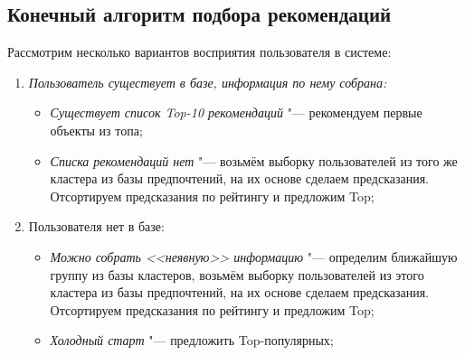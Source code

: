 \documentclass[a4paper,14pt]{article}
\begin{document}
\subsection{Конечный алгоритм подбора рекомендаций}
Рассмотрим несколько вариантов восприятия пользователя в системе:
\begin{enumerate}
\item {\it Пользователь существует в базе, информация по нему собрана:}
\begin{itemize}
\item {\it Существует список Top-10 рекомендаций} "--- рекомендуем первые объекты из топа;
\item {\it Списка рекомендаций нет} "--- возьмём выборку пользователей из того же кластера из базы предпочтений, на их основе сделаем предсказания. Отсортируем предсказания по рейтингу и предложим Top;
\end{itemize} 
\item Пользователя нет в базе:
\begin{itemize}
\item {\it Можно собрать <<неявную>> информацию} "--- определим ближайшую группу из базы кластеров, возьмём выборку пользователей из этого кластера из базы предпочтений, на их основе сделаем предсказания. Отсортируем предсказания по рейтингу и предложим Top;
\item {\it Холодный старт } "--- предложить Top-популярных;
\end{itemize} 
\end{enumerate}
\end{document}
